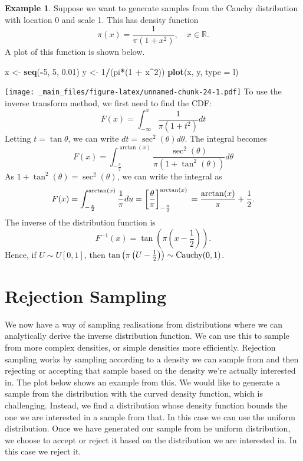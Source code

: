 \documentclass[
]{book}
\newenvironment{Shaded}{\begin{snugshade}}{\end{snugshade}}
\newcommand{\AttributeTok}[1]{\textcolor[rgb]{0.13,0.29,0.53}{#1}}
\newcommand{\DecValTok}[1]{\textcolor[rgb]{0.00,0.00,0.81}{#1}}
\newcommand{\FloatTok}[1]{\textcolor[rgb]{0.00,0.00,0.81}{#1}}
\newcommand{\FunctionTok}[1]{\textcolor[rgb]{0.13,0.29,0.53}{\textbf{#1}}}
\newcommand{\NormalTok}[1]{#1}
\newcommand{\OtherTok}[1]{\textcolor[rgb]{0.56,0.35,0.01}{#1}}
\newcommand{\SpecialCharTok}[1]{\textcolor[rgb]{0.81,0.36,0.00}{\textbf{#1}}}
\newcommand{\StringTok}[1]{\textcolor[rgb]{0.31,0.60,0.02}{#1}}
\theoremstyle{definition}
\theoremstyle{definition}
\newtheorem{example}{Example}[chapter]
\theoremstyle{definition}
\theoremstyle{definition}
\theoremstyle{remark}
\begin{document}
\begin{example}
Suppose we want to generate samples from the Cauchy distribution with location 0 and scale 1. This has density function
\[
\pi(x) = \frac{1}{\pi(1+x^2)}, \quad x \in \mathbb{R}.
\]
A plot of this function is shown below.

\begin{Shaded}
\begin{Highlighting}[]
\NormalTok{x }\OtherTok{\textless{}{-}} \FunctionTok{seq}\NormalTok{(}\SpecialCharTok{{-}}\DecValTok{5}\NormalTok{, }\DecValTok{5}\NormalTok{, }\FloatTok{0.01}\NormalTok{)}
\NormalTok{y }\OtherTok{\textless{}{-}} \DecValTok{1}\SpecialCharTok{/}\NormalTok{(pi}\SpecialCharTok{*}\NormalTok{(}\DecValTok{1} \SpecialCharTok{+}\NormalTok{ x}\SpecialCharTok{\^{}}\DecValTok{2}\NormalTok{))}
\FunctionTok{plot}\NormalTok{(x, y, }\AttributeTok{type =} \StringTok{\textquotesingle{}l\textquotesingle{}}\NormalTok{)}
\end{Highlighting}
\end{Shaded}

\texttt{[image: \_main\_files/figure-latex/unnamed-chunk-24-1.pdf]}
To use the inverse transform method, we first need to find the CDF:
\[
F(x) = \int_{-\infty}^x \frac{1}{\pi(1+t^2)}dt
\]
Letting \(t = \tan \theta\), we can write \(dt = \sec^2(\theta)d\theta\). The integral becomes
\[
F(x) = \int_{-\frac{\pi}{2}}^{\arctan(x)} \frac{\sec^2(\theta)}{\pi(1+\tan^2(\theta))} d\theta
\]
As \(1 + \tan^2(\theta) = \sec^2(\theta)\), we can write the integral as
\[
F(x) = \int_{-\frac{\pi}{2}}^{\arctan(x)} \frac{1}{\pi}du\\
= \left[\frac{\theta}{\pi}\right]_{-\frac{\pi}{2}}^{\arctan(x)}\\
= \frac{\arctan(x)}{\pi} + \frac{1}{2}.
\]
The inverse of the distribution function is
\[
F^{-1}(x) = \tan\left(\pi\left(x - \frac{1}{2}\right)\right).
\]
Hence, if \(U \sim U[0, 1]\), then \(\tan\left(\pi\left(U - \frac{1}{2}\right)\right) \sim \hbox{Cauchy}(0, 1)\).
\end{example}

\hypertarget{rejection-sampling}{%
\section{Rejection Sampling}\label{rejection-sampling}}

We now have a way of sampling realisations from distributions where we can analytically derive the inverse distribution function. We can use this to sample from more complex densities, or simple densities more efficiently. Rejection sampling works by sampling according to a density we can sample from and then rejecting or accepting that sample based on the density we're actually interested in. The plot below shows an example from this. We would like to generate a sample from the distribution with the curved density function, which is challenging. Instead, we find a distribution whose density function bounds the one we are interested in a sample from that. In this case we can use the uniform distribution. Once we have generated our sample from he uniform distribution, we choose to accept or reject it based on the distribution we are interested in. In this case we reject it.
\end{document}

